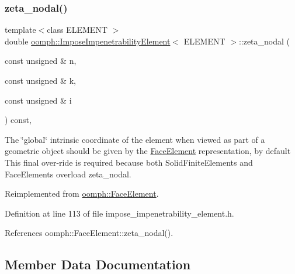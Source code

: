\mbox{\label{classoomph_1_1ImposeImpenetrabilityElement_acd1ef4e239729447691ba0b973e395ae}} 
\subsubsection{\texorpdfstring{zeta\+\_\+nodal()}{zeta\_nodal()}}
{\footnotesize\ttfamily template$<$class E\+L\+E\+M\+E\+NT $>$ \\
double \hyperlink{classoomph_1_1ImposeImpenetrabilityElement}{oomph\+::\+Impose\+Impenetrability\+Element}$<$ E\+L\+E\+M\+E\+NT $>$\+::zeta\+\_\+nodal (\begin{DoxyParamCaption}\item[{const unsigned \&}]{n,  }\item[{const unsigned \&}]{k,  }\item[{const unsigned \&}]{i }\end{DoxyParamCaption}) const\hspace{0.3cm}{\ttfamily [inline]}, {\ttfamily [virtual]}}



The \char`\"{}global\char`\"{} intrinsic coordinate of the element when viewed as part of a geometric object should be given by the \hyperlink{classoomph_1_1FaceElement}{Face\+Element} representation, by default This final over-\/ride is required because both Solid\+Finite\+Elements and Face\+Elements overload zeta\+\_\+nodal. 



Reimplemented from \hyperlink{classoomph_1_1FaceElement_a58c9f93705c7741f76c8487d152e68a6}{oomph\+::\+Face\+Element}.



Definition at line 113 of file impose\+\_\+impenetrability\+\_\+element.\+h.



References oomph\+::\+Face\+Element\+::zeta\+\_\+nodal().



\subsection{Member Data Documentation}
\mbox{\label{classoomph_1_1ImposeImpenetrabilityElement_a6a8cf1048dbcc32288ea8eca1e6c380d}} 
